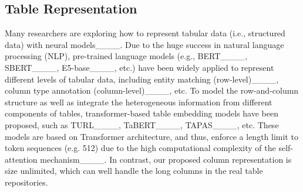 \subsection{Table Representation}
Many researchers are exploring how to represent tabular data (i.e., structured data) with neural models____. Due to the huge success in natural language processing (NLP), pre-trained language models (e.g., BERT____, SBERT____, E5-base____, etc.) have been widely applied to represent different levels of tabular data, including entity matching (row-level)____, column type annotation (column-level)____, etc. To model the row-and-column structure as well as integrate the heterogeneous information from different components of tables, transformer-based table embedding models have been proposed, such as TURL____, TaBERT____, TAPAS____, etc. These models are based on Transformer architecture, and thus, enforce a length limit to token sequences (e.g. 512) due to the high computational complexity of the self-attention mechanism____. In contrast, our proposed column representation is size unlimited, which can well handle the long columns in the real table repositories.


